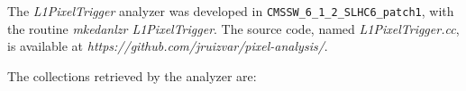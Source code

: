 \documentclass[a4paper,12pt,oneside]{article}
\begin{document}

                   The \textit{L1PixelTrigger} analyzer was developed in \texttt{CMSSW\_6\_1\_2\_SLHC6\_patch1}, with the routine {\it mkedanlzr L1PixelTrigger}. The source code, named {\it L1PixelTrigger.cc}, is available at 
{\it https://github.com/jruizvar/pixel-analysis/}. 

The collections retrieved by the analyzer are:
\end{document}
